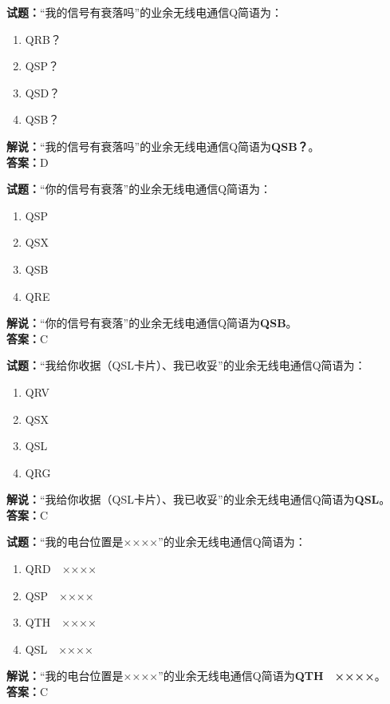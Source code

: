 \documentclass{ctexbook}
\begin{document}
\bigskip


\noindent\textbf{试题：}“我的信号有衰落吗”的业余无线电通信Q简语为：
\begin{enumerate}[leftmargin=3em]
\item QRB？
\item QSP？
\item QSD？
\item QSB？
\end{enumerate}
\noindent\textbf{解说：}“我的信号有衰落吗”的业余无线电通信Q简语为\textbf{QSB？}。\\\noindent\textbf{答案：}D



\bigskip


\noindent\textbf{试题：}“你的信号有衰落”的业余无线电通信Q简语为：
\begin{enumerate}[leftmargin=3em]
\item QSP
\item QSX
\item QSB
\item QRE
\end{enumerate}
\noindent\textbf{解说：}“你的信号有衰落”的业余无线电通信Q简语为\textbf{QSB}。\\\noindent\textbf{答案：}C



\bigskip


\noindent\textbf{试题：}“我给你收据（QSL卡片）、我已收妥”的业余无线电通信Q简语为：
\begin{enumerate}[leftmargin=3em]
\item QRV
\item QSX
\item QSL
\item QRG
\end{enumerate}
\noindent\textbf{解说：}“我给你收据（QSL卡片）、我已收妥”的业余无线电通信Q简语为\textbf{QSL}。\\\noindent\textbf{答案：}C

\bigskip


\noindent\textbf{试题：}“我的电台位置是××××”的业余无线电通信Q简语为：
\begin{enumerate}[leftmargin=3em]
\item QRD　××××
\item QSP　××××
\item QTH　××××
\item QSL　××××
\end{enumerate}
\noindent\textbf{解说：}“我的电台位置是××××”的业余无线电通信Q简语为\textbf{QTH　××××}。\\\noindent\textbf{答案：}C
\end{document}
